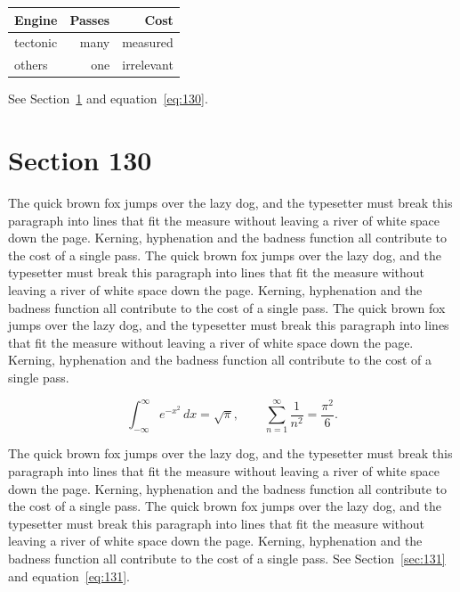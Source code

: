 \documentclass{article}
\begin{document}
\begin{center}
\begin{tabular}{lrr}
\toprule
Engine & Passes & Cost \\
\midrule
tectonic & many & measured \\
others & one & irrelevant \\
\bottomrule
\end{tabular}
\end{center}

See Section~\ref{sec:130} and equation~\eqref{eq:130}.
\section{Section 130}
\label{sec:130}
The quick brown fox jumps over the lazy dog, and the typesetter must break this paragraph into lines that fit the measure without leaving a river of white space down the page. Kerning, hyphenation and the badness function all contribute to the cost of a single pass. The quick brown fox jumps over the lazy dog, and the typesetter must break this paragraph into lines that fit the measure without leaving a river of white space down the page. Kerning, hyphenation and the badness function all contribute to the cost of a single pass. The quick brown fox jumps over the lazy dog, and the typesetter must break this paragraph into lines that fit the measure without leaving a river of white space down the page. Kerning, hyphenation and the badness function all contribute to the cost of a single pass. 

\begin{equation}\label{eq:130}
\int_{-\infty}^{\infty} e^{-x^{2}}\,dx = \sqrt{\pi}, \qquad
\sum_{n=1}^{\infty} \frac{1}{n^{2}} = \frac{\pi^{2}}{6}.
\end{equation}

The quick brown fox jumps over the lazy dog, and the typesetter must break this paragraph into lines that fit the measure without leaving a river of white space down the page. Kerning, hyphenation and the badness function all contribute to the cost of a single pass. The quick brown fox jumps over the lazy dog, and the typesetter must break this paragraph into lines that fit the measure without leaving a river of white space down the page. Kerning, hyphenation and the badness function all contribute to the cost of a single pass. 
See Section~\ref{sec:131} and equation~\eqref{eq:131}.
\end{document}
